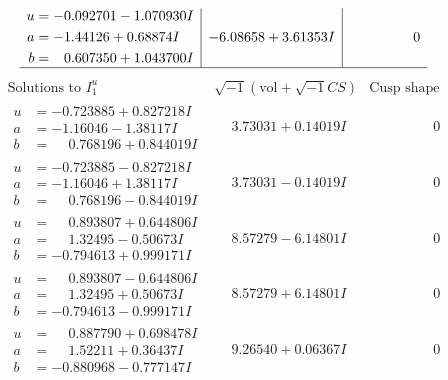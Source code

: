 \documentclass[1p]{elsarticle_modified}
\theoremstyle{definition}
\newcommand{\I}{\sqrt{-1}}
\begin{document}
$$\begin{array}{c|c|c}
\begin{aligned}
u &= -0.092701 - 1.070930 I \\
a &= -1.44126 + 0.68874 I \\
b &= \phantom{-}0.607350 + 1.043700 I\end{aligned}
 & -6.08658 + 3.61353 I & \phantom{-0.000000 } 0\\
 \hline 
 \end{array}$$\newpage$$\begin{array}{c|c|c}  
\text{Solutions to }I^u_{1}& \I (\text{vol} + \sqrt{-1}CS) & \text{Cusp shape}\\
 \hline 
\begin{aligned}
u &= -0.723885 + 0.827218 I \\
a &= -1.16046 - 1.38117 I \\
b &= \phantom{-}0.768196 + 0.844019 I\end{aligned}
 & \phantom{-}3.73031 + 0.14019 I & \phantom{-0.000000 } 0 \\ \hline\begin{aligned}
u &= -0.723885 - 0.827218 I \\
a &= -1.16046 + 1.38117 I \\
b &= \phantom{-}0.768196 - 0.844019 I\end{aligned}
 & \phantom{-}3.73031 - 0.14019 I & \phantom{-0.000000 } 0 \\ \hline\begin{aligned}
u &= \phantom{-}0.893807 + 0.644806 I \\
a &= \phantom{-}1.32495 - 0.50673 I \\
b &= -0.794613 + 0.999171 I\end{aligned}
 & \phantom{-}8.57279 - 6.14801 I & \phantom{-0.000000 } 0 \\ \hline\begin{aligned}
u &= \phantom{-}0.893807 - 0.644806 I \\
a &= \phantom{-}1.32495 + 0.50673 I \\
b &= -0.794613 - 0.999171 I\end{aligned}
 & \phantom{-}8.57279 + 6.14801 I & \phantom{-0.000000 } 0 \\ \hline\begin{aligned}
u &= \phantom{-}0.887790 + 0.698478 I \\
a &= \phantom{-}1.52211 + 0.36437 I \\
b &= -0.880968 - 0.777147 I\end{aligned}
 & \phantom{-}9.26540 + 0.06367 I & \phantom{-0.000000 } 0 \\ \hline\begin{aligned}

\end{aligned}
\end{array}$$
\end{document}

